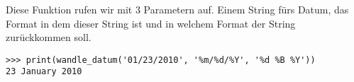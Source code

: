 \noindent
Diese Funktion rufen wir mit 3 Parametern auf. Einem String fürs Datum, das Format in dem dieser String ist und in welchem Format der String zurückkommen soll.

\begin{Verbatim}[frame=single]
>>> print(wandle_datum('01/23/2010', '%m/%d/%Y', '%d %B %Y'))
23 January 2010
\end{Verbatim}

\newpage
